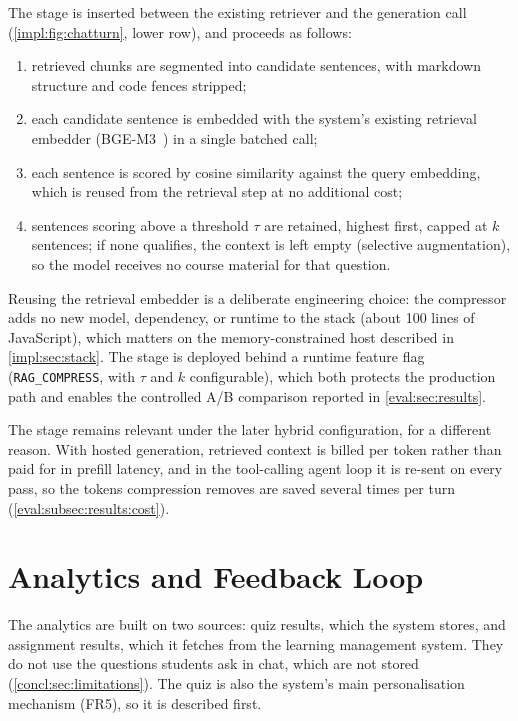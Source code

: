 The stage is inserted between the existing retriever and the generation call
(\autoref{impl:fig:chatturn}, lower row), and proceeds as follows:

\begin{enumerate}[nosep]
  \item retrieved chunks are segmented into candidate sentences, with markdown
        structure and code fences stripped;
  \item each candidate sentence is embedded with the system's existing retrieval
        embedder (BGE-M3~\cite{arxiv24:Chen}) in a single batched call;
  \item each sentence is scored by cosine similarity against the query embedding,
        which is reused from the retrieval step at no additional cost;
  \item sentences scoring above a threshold $\tau$ are retained, highest first,
        capped at $k$ sentences; if none qualifies, the context is left empty
        (selective augmentation), so the model receives no course material
        for that question.
\end{enumerate}

Reusing the retrieval embedder is a deliberate engineering choice: the compressor
adds no new model, dependency, or runtime to the stack (about 100 lines of
JavaScript), which matters on the memory-constrained host described in
\autoref{impl:sec:stack}. The stage is deployed behind a runtime feature flag
(\texttt{RAG\_COMPRESS}, with $\tau$ and $k$ configurable), which both protects
the production path and enables the controlled A/B comparison reported in
\autoref{eval:sec:results}.

The stage remains relevant under the later hybrid configuration, for a
different reason. With hosted generation, retrieved context is billed per
token rather than paid for in prefill latency, and in the tool-calling agent
loop it is re-sent on every pass, so the tokens compression removes are
saved several times per turn (\autoref{eval:subsec:results:cost}).

\section{Analytics and Feedback Loop}
\label{impl:sec:analytics}

The analytics are built on two sources: quiz results, which the system
stores, and assignment results, which it fetches from the learning management
system. They do not use the questions students ask in chat, which are not
stored (\autoref{concl:sec:limitations}). The quiz is also the system's main
personalisation mechanism (FR5), so it is described first.

